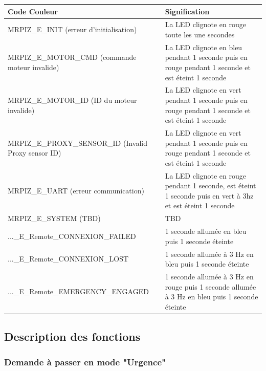 \begin{tabularx}{\textwidth}{|X|X|}
    \hline
    \textbf{Code Couleur} & \textbf{Signification} \\
    \hline
    MRPIZ\_E\_INIT (erreur d'initialisation)  & La LED clignote en rouge toute les une secondes  \\
    \hline
    MRPIZ\_E\_MOTOR\_CMD (commande moteur invalide)  & La LED clignote en bleu pendant 1 seconde puis en rouge pendant 1 seconde et est éteint 1 seconde  \\
    \hline
    MRPIZ\_E\_MOTOR\_ID (ID du moteur invalide)  & La LED clignote en vert pendant 1 seconde puis en rouge pendant 1 seconde et est éteint 1 seconde  \\
    \hline
    MRPIZ\_E\_PROXY\_SENSOR\_ID (Invalid Proxy sensor ID)  & La LED clignote en vert pendant 1 seconde puis en rouge pendant 1 seconde et est éteint 1 seconde  \\
    \hline
    MRPIZ\_E\_UART (erreur communication) & La LED clignote en rouge pendant 1 seconde, est éteint 1 seconde puis en vert à 3hz et est éteint 1 seconde \\
    \hline
    MRPIZ\_E\_SYSTEM (TBD) & TBD \\
    \hline
    ...\_E\_Remote\_CONNEXION\_FAILED & 1 seconde allumée en bleu puis 1 seconde éteinte \\
    \hline
    ...\_E\_Remote\_CONNEXION\_LOST & 1 seconde allumée à 3 Hz en bleu puis 1 seconde éteinte \\
    \hline
    ...\_E\_Remote\_EMERGENCY\_ENGAGED & 1 seconde allumée à 3 Hz en rouge puis 1 seconde allumée à 3 Hz en bleu puis 1 seconde éteinte \\
    \hline
\end{tabularx}

\subsection{Description des fonctions}

\subsubsection{Demande à passer en mode "Urgence"}

